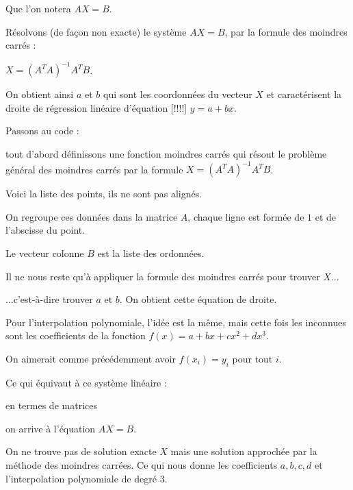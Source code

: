 \change
Que l'on notera $AX = B.$

\change  
Résolvons (de façon non exacte) le système $AX = B$, par la formule des moindres carrés :

\change
$X = (A^TA)^{-1} A^T B$.

\change
On obtient ainsi $a$ et $b$ qui sont les coordonnées du vecteur $X$
et caractérisent la droite de régression linéaire d'équation [!!!!] $y=a+bx$.


  
\diapo 

 
Passons au code :

tout d'abord définissons une fonction moindres carrés qui 
résout le problème général des moindres carrés
par la formule $X = (A^TA)^{-1} A^T B$.


\change

Voici la liste des points, ils ne sont pas alignés.

\change
On regroupe ces données dans la matrice $A$, chaque ligne est formée de $1$ et de  
l'abscisse du point.

Le vecteur colonne $B$ est la liste des ordonnées.

Il ne nous reste qu'à appliquer la formule des moindres carrés pour trouver $X$...

\change
...c'est-à-dire trouver $a$ et $b$. On obtient cette équation de droite.

\diapo

Pour l'interpolation polynomiale,
l'idée est la même, mais cette fois les inconnues
sont les coefficients de la fonction
$f(x) = a + bx +c x^2 + dx^3$.
  
On aimerait comme précédemment avoir $f(x_i)=y_i$ pour tout $i$.
  
Ce qui équivaut à ce système linéaire :

en termes de matrices  

on arrive à l'équation $AX=B$.

On ne trouve pas de solution exacte $X$ mais une solution approchée par la méthode des moindres carrées. Ce qui nous donne les coefficients $a,b,c,d$ et l'interpolation polynomiale de degré $3$.




